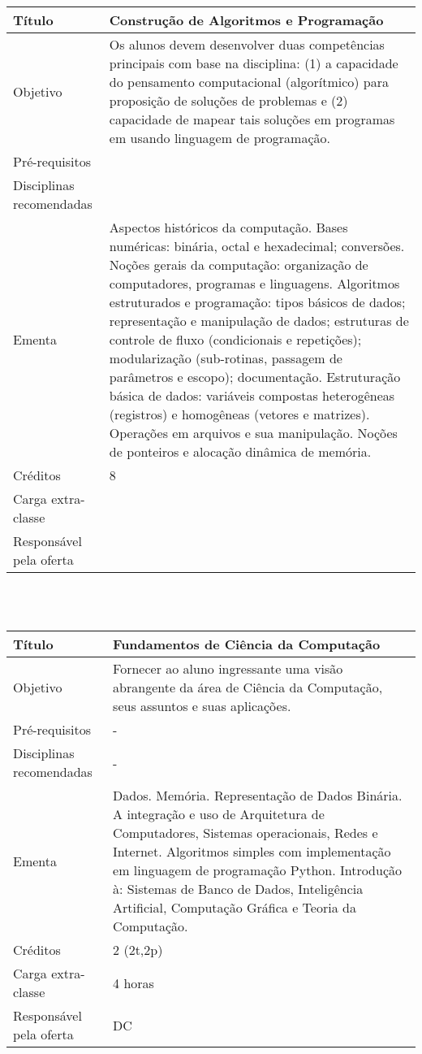 \begin{tabular}{|p{4.5cm}|p{10.0cm}|} \hline

Título & Construção de Algoritmos e Programação \\ \hline
Objetivo & Os alunos devem desenvolver duas competências principais com base na disciplina: (1) a capacidade do pensamento computacional (algorítmico) para proposição de soluções de problemas e (2) capacidade de mapear tais soluções em programas em usando linguagem de programação.\\ \hline
Pré-requisitos &  \\ \hline
Disciplinas recomendadas &  \\ \hline
Ementa &  Aspectos históricos da computação. Bases numéricas: binária, octal e hexadecimal; conversões. Noções gerais da computação: organização de computadores, programas e linguagens. Algoritmos estruturados e programação: tipos básicos de dados; representação e manipulação de dados; estruturas de controle de fluxo (condicionais e repetições); modularização (sub-rotinas, passagem de parâmetros e escopo); documentação. Estruturação básica de dados: variáveis compostas heterogêneas (registros) e homogêneas (vetores e matrizes). Operações em arquivos e sua manipulação. Noções de ponteiros e alocação dinâmica de memória.\\ \hline
Créditos & 8 \\ \hline
Carga extra-classe &  \\ \hline
Responsável pela oferta &  \\ \hline
\end{tabular}
\\
\\




\begin{tabular}{|p{4.5cm}|p{10.0cm}|} \hline

Título & Fundamentos de Ciência da Computação \\ \hline
Objetivo & Fornecer ao aluno ingressante uma visão abrangente da área de Ciência da Computação, seus assuntos e suas aplicações. \\    \hline
Pré-requisitos &  -  \\ \hline
Disciplinas recomendadas & -  \\ \hline
Ementa & Dados. Memória. Representação de Dados Binária. A integração e uso de Arquitetura de Computadores, Sistemas operacionais, Redes e Internet. Algoritmos simples com implementação em linguagem de programação Python.  Introdução à: Sistemas de Banco de Dados, Inteligência Artificial, Computação Gráfica e Teoria da Computação.
  \\ \hline
Créditos & 2 (2t,2p) \\ \hline
Carga extra-classe & 4 horas \\ \hline
Responsável pela oferta & DC \\ \hline
\end{tabular}

